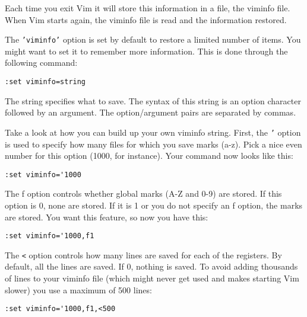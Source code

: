 Each time you exit Vim it will store this information in a file, the viminfo file.
When Vim starts again, the viminfo file is read and the information restored.

The \texttt{'viminfo'} option is set by default to restore a limited number of items.
You might want to set it to remember more information.
This is done through the following command:

\begin{Verbatim}[samepage=true]
 :set viminfo=string
\end{Verbatim}

The string specifies what to save.
The syntax of this string is an option character followed by an argument.
The option/argument pairs are separated by commas.

Take a look at how you can build up your own viminfo string.
First, the \texttt{'} option is used to specify how many files for which you save marks (a-z).
Pick a nice even number for this option (1000, for instance).
Your command now looks like this:

\begin{Verbatim}[samepage=true]
 :set viminfo='1000
\end{Verbatim}

The f option controls whether global marks (A-Z and 0-9) are stored.
If this option is 0, none are stored.
If it is 1 or you do not specify an f option, the marks are stored.
You want this feature, so now you have this:

\begin{Verbatim}[samepage=true]
 :set viminfo='1000,f1
\end{Verbatim}

The \texttt{<} option controls how many lines are saved for each of the registers.
By default, all the lines are saved.
If 0, nothing is saved.
To avoid adding thousands of lines to your viminfo file (which might never get used and makes starting Vim slower) you use a maximum of 500 lines:

\begin{Verbatim}[samepage=true]
 :set viminfo='1000,f1,<500
\end{Verbatim}
 
